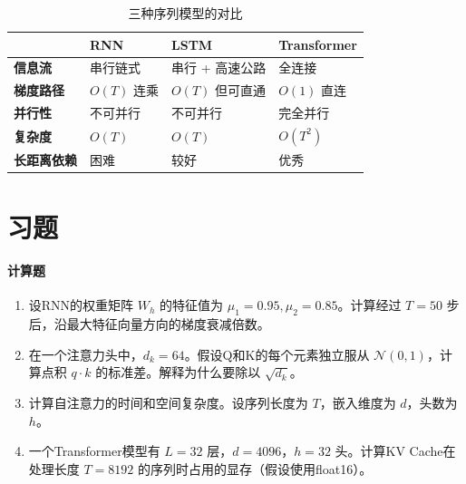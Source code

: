 \begin{table}[htbp]
\centering
\renewcommand{\arraystretch}{1.4}
\begin{tabularx}{\textwidth}{p{2.2cm}|X|X|X}
\toprule
& \textbf{RNN} & \textbf{LSTM} & \textbf{Transformer} \\
\midrule
\textbf{信息流} & 串行链式 & 串行 + 高速公路 & 全连接 \\
\textbf{梯度路径} & $O(T)$ 连乘 & $O(T)$ 但可直通 & $O(1)$ 直连 \\
\textbf{并行性} & 不可并行 & 不可并行 & 完全并行 \\
\textbf{复杂度} & $O(T)$ & $O(T)$ & $O(T^2)$ \\
\textbf{长距离依赖} & 困难 & 较好 & 优秀 \\
\bottomrule
\end{tabularx}
\caption{三种序列模型的对比}
\end{table}

\section{习题}

\paragraph{计算题}
\begin{enumerate}
    \item 设RNN的权重矩阵 $W_h$ 的特征值为 $\mu_1 = 0.95, \mu_2 = 0.85$。计算经过 $T = 50$ 步后，沿最大特征向量方向的梯度衰减倍数。
    
    \item 在一个注意力头中，$d_k = 64$。假设Q和K的每个元素独立服从 $\mathcal{N}(0, 1)$，计算点积 $q \cdot k$ 的标准差。解释为什么要除以 $\sqrt{d_k}$。
    
    \item 计算自注意力的时间和空间复杂度。设序列长度为 $T$，嵌入维度为 $d$，头数为 $h$。
    
    \item 一个Transformer模型有 $L = 32$ 层，$d = 4096$，$h = 32$ 头。计算KV Cache在处理长度 $T = 8192$ 的序列时占用的显存（假设使用float16）。
\end{enumerate}

